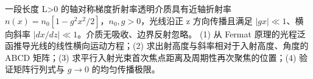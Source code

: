 一段长度 L>0 的轴对称梯度折射率透明介质具有近轴折射率 \(n(x)=n_{0}[1-g^{2}x^{2}/2]\)，\(n_{0},g>0\)，光线沿正 z 方向传播且满足 \(|gx|\ll 1\)、横向斜率 \(|dx/dz|\ll 1\)。介质无吸收、边界反射忽略。
(1) 从 Fermat 原理的光程泛函推导光线的线性横向运动方程；(2) 求出射高度与斜率相对于入射高度、角度的 ABCD 矩阵；(3) 求平行入射光束首次焦点距离及周期性再次聚焦的位置；(4) 验证矩阵行列式与 \(g\to 0\) 的均匀传播极限。
